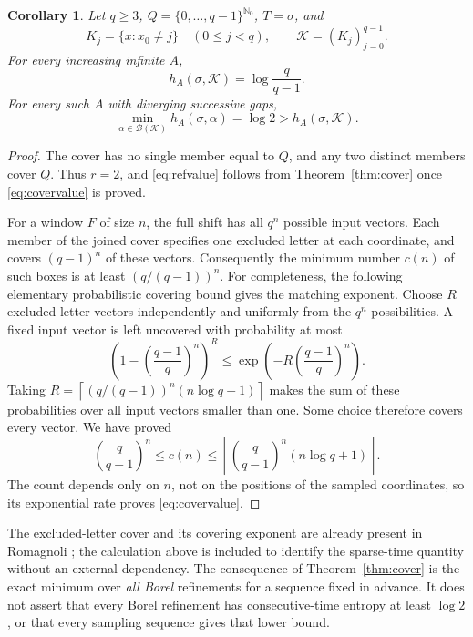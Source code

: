 \documentclass[11pt,reqno]{amsart}
\numberwithin{equation}{section}
\newtheorem{corollary}[theorem]{Corollary}
\theoremstyle{definition}
\theoremstyle{remark}
\newcommand{\Nzero}{\mathbb N_0}
\newcommand{\K}{\mathcal K}
\begin{document}
\begin{corollary}\label{cor:covergap}
Let $q\ge3$, $Q=\{0,\ldots,q-1\}^{\Nzero}$, $T=\sigma$, and
\[
 K_j=\{x:x_0\ne j\}\quad(0\le j<q),\qquad \K=(K_j)_{j=0}^{q-1}.
\]
For every increasing infinite $A$,
\begin{equation}\label{eq:covervalue}
 h_A(\sigma,\K)=\log\frac q{q-1}.
\end{equation}
For every such $A$ with diverging successive gaps,
\begin{equation}\label{eq:refvalue}
 \min_{\alpha\in\mathcal B(\K)}h_A(\sigma,\alpha)=\log2
 >h_A(\sigma,\K).
\end{equation}
\end{corollary}
\begin{proof}
The cover has no single member equal to $Q$, and any two distinct
members cover $Q$. Thus $r=2$, and \eqref{eq:refvalue} follows from
Theorem~\ref{thm:cover} once \eqref{eq:covervalue} is proved.

For a window $F$ of size $n$, the full shift has all $q^n$ possible
input vectors. Each member of the joined cover specifies one excluded
letter at each coordinate, and covers $(q-1)^n$ of these vectors.
Consequently the minimum number $c(n)$ of such boxes is at least
$(q/(q-1))^n$. For completeness, the following elementary probabilistic
covering bound gives the matching exponent. Choose $R$ excluded-letter
vectors independently and uniformly from the $q^n$ possibilities. A
fixed input vector is left uncovered with probability at most
\[
 \left(1-\left(\frac{q-1}{q}\right)^n\right)^R
 \le \exp\left(-R\left(\frac{q-1}{q}\right)^n\right).
\]
Taking
$R=\left\lceil(q/(q-1))^n(n\log q+1)\right\rceil$ makes the sum of
these probabilities over all input vectors smaller than one. Some
choice therefore covers every vector. We have proved
\[
 \left(\frac q{q-1}\right)^n\le c(n)
 \le\left\lceil\left(\frac q{q-1}\right)^n(n\log q+1)\right\rceil.
\]
The count depends only on $n$, not on the positions of the sampled
coordinates, so its exponential rate proves \eqref{eq:covervalue}.
\end{proof}

The excluded-letter cover and its covering exponent are already present
in Romagnoli \cite{Romagnoli2007}; the calculation above is included to
identify the sparse-time quantity without an external dependency.
The consequence of Theorem~\ref{thm:cover} is the exact minimum over
\emph{all Borel} refinements for a sequence fixed in advance. It does not
assert that every Borel refinement has consecutive-time entropy at least
$\log2$, or that every sampling sequence gives that lower bound.
\end{document}
